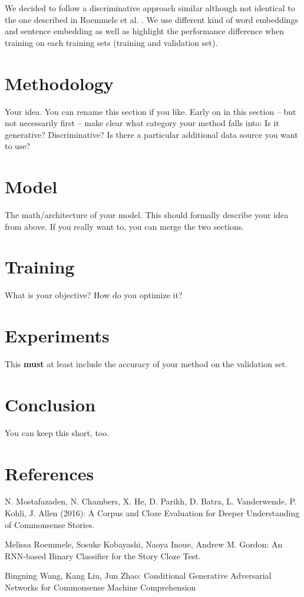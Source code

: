 \documentclass{article}
\begin{document}
We decided to follow a discriminative approach similar although not identical to the one described in Roemmele et al. \cite{Roemmele}. We use different kind of word embeddings and sentence embedding as well as highlight the performance difference when training on each training sets (training and validation set).

\section{Methodology}
Your idea. You can rename this section if you like. Early on in this section -- but not necessarily first -- make clear what category your method falls into: Is it generative? Discriminative? Is there a particular additional data source you want to use?
\section{Model}
The math/architecture of your model. This should formally describe your idea from above. If you really want to, you can merge the two sections.
\section{Training}
What is your objective? How do you optimize it?

\section{Experiments}
This {\bf must} at least include the accuracy of your method on the validation set.
\section{Conclusion}
You can keep this short, too.

\section{References}
\begin{thebibliography}{9}
 N. Mostafazaden, N. Chambers, X. He, D. Parikh, D. Batra, L. Vanderwende, P. Kohli, J. Allen (2016): A Corpus and Cloze Evaluation for Deeper Understanding of Commonsense Stories.

 Melissa Roemmele, Sosuke Kobayashi, Naoya Inoue, Andrew M. Gordon: An RNN-based Binary Classifier for the Story Cloze Test.

 Bingning Wang, Kang Liu, Jun Zhao: Conditional Generative Adversarial Networks for Commonsense Machine Comprehension


\end{thebibliography}
\end{document}
